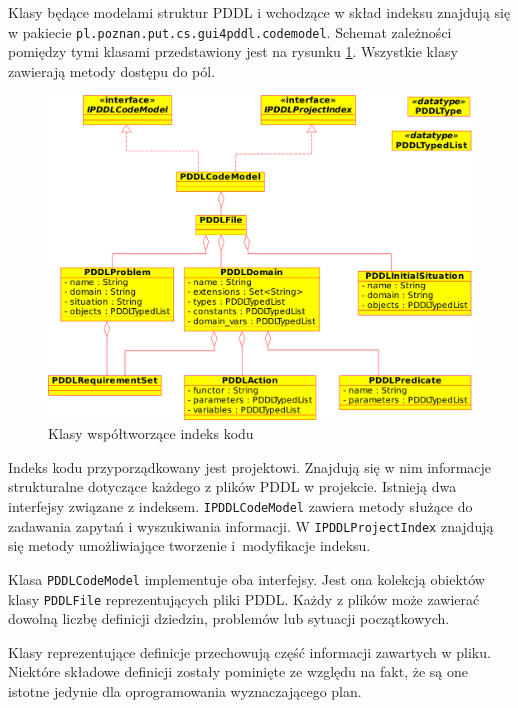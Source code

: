 Klasy będące modelami struktur PDDL i wchodzące w skład indeksu znajdują się w pakiecie
\texttt{pl.poznan.put.cs.gui4pddl.codemodel}. Schemat zależności pomiędzy tymi klasami
przedstawiony jest na rysunku \ref{ana_model}. Wszystkie klasy zawierają metody dostępu
do pól.

\begin{figure}[h]
  \centering
    \includegraphics[width=\textwidth]{img/ana_model.pdf}
    \caption{Klasy współtworzące indeks kodu}
    \label{ana_model}
\end{figure}

Indeks kodu przyporządkowany jest projektowi. Znajdują się w nim informacje strukturalne dotyczące każdego
z plików PDDL w projekcie. Istnieją dwa interfejsy związane z indeksem. \texttt{IPDDLCodeModel}
zawiera metody służące do zadawania zapytań i wyszukiwania informacji. W \texttt{IPDDLProjectIndex}
znajdują się metody umożliwiające tworzenie i~modyfikacje indeksu.

Klasa \texttt{PDDLCodeModel} implementuje oba interfejsy. Jest ona kolekcją obiektów klasy
\texttt{PDDLFile} reprezentujących pliki PDDL. Każdy z plików może zawierać dowolną liczbę
definicji dziedzin, problemów lub sytuacji początkowych. 

Klasy reprezentujące definicje przechowują część informacji zawartych w pliku. Niektóre
składowe definicji zostały pominięte ze względu na fakt, że są one istotne jedynie 
dla oprogramowania wyznaczającego plan.

